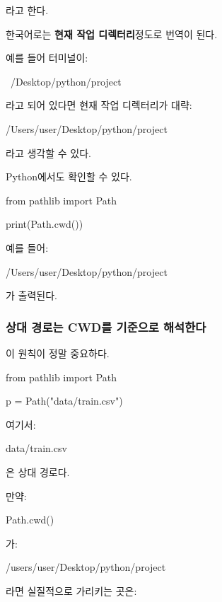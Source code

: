 라고 한다.

한국어로는 \textbf{현재 작업 디렉터리}정도로 번역이 된다.

예를 들어 터미널이:

\begin{dhkzsh}
~/Desktop/python/project %
\end{dhkzsh}

라고 되어 있다면 현재 작업 디렉터리가 대략:

\begin{dhkzsh}
/Users/user/Desktop/python/project
\end{dhkzsh}

라고 생각할 수 있다.

Python에서도 확인할 수 있다.

\begin{dhkcode}
from pathlib import Path

print(Path.cwd())
\end{dhkcode}

예를 들어:

\begin{dhkzsh}
/Users/user/Desktop/python/project
\end{dhkzsh}

가 출력된다.

\subsubsection{상대 경로는 CWD를 기준으로 해석한다}

이 원칙이 정말 중요하다.

\begin{dhkcode}
from pathlib import Path

p = Path("data/train.csv")
\end{dhkcode}

여기서:

\begin{dhkzsh}
data/train.csv
\end{dhkzsh}

은 상대 경로다.

만약:

\begin{dhkcode}
Path.cwd()
\end{dhkcode}

가:

\begin{dhkzsh}
/users/user/Desktop/python/project
\end{dhkzsh}

라면 실질적으로 가리키는 곳은:

